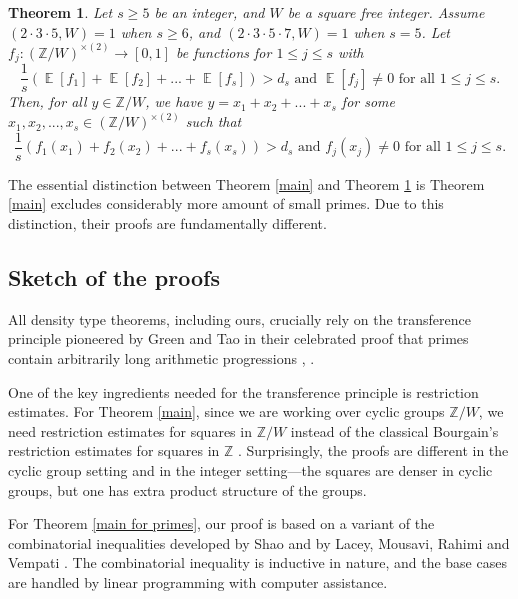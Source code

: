 \documentclass[11pt]{amsart}
\theoremstyle{plain} %
\newtheorem{thm}{Theorem}[section]
\theoremstyle{remark}
\numberwithin{equation}{section}
\newcommand{\E}{\mathop{\mathbb{E}}}
\newcommand{\Z}{\mathbb{Z}}
\begin{document}
\begin{thm}\label{main for almost all moduli}
    Let $s\geq 5$ be an integer, and $W$ be a square free integer. Assume $(2\cdot3\cdot5,W)=1$ when $s\geq 6$, and $(2\cdot3\cdot5\cdot7,W)=1$ when $s=5$. Let $f_j:(\Z/W)^{\times(2)}\longrightarrow[0,1]$ be functions for $1\leq j\leq s$ with
    \begin{equation*}
        \text{$\frac{1}{s}(\E[f_1]+\E[f_2]+...+\E[f_s])>d_s$ and $\E[f_j]\neq 0$ for all $1\leq j\leq s$.}
    \end{equation*}
    Then, for all $y\in \Z/W$, we have $y=x_1+x_2+...+x_s$ for some $x_1,x_2,...,x_s\in (\Z/W)^{\times(2)}$ such that
    \begin{equation*}
        \text{$\frac{1}{s}(f_1(x_1)+f_2(x_2)+...+f_s(x_s))>d_s$ and $f_j(x_j)\neq 0$ for all $1\leq j \leq s$.}
    \end{equation*}
\end{thm}

The essential distinction between Theorem \ref{main} and Theorem \ref{main for almost all moduli} is Theorem \ref{main} excludes considerably more amount of small primes. Due to this distinction, their proofs are fundamentally different.

\subsection{Sketch of the proofs}

All density type theorems, including ours, crucially rely on the transference principle pioneered by Green and Tao in their celebrated proof that primes contain arbitrarily long arithmetic progressions \cite{Green}, \cite{GreenTao}. 

One of the key ingredients needed for the transference principle is restriction estimates. For Theorem \ref{main}, since we are working over cyclic groups $\Z/W$, we need restriction estimates for squares in $\Z/W$ instead of the classical Bourgain's restriction estimates for squares in $\Z$ \cite{Bourgain}. Surprisingly, the proofs are different in the cyclic group setting and in the integer setting---the squares are denser in cyclic groups, but one has extra product structure of the groups.

For Theorem \ref{main for primes}, our proof is based on a variant of the combinatorial inequalities developed by Shao \cite{Shao} and by Lacey, Mousavi, Rahimi and Vempati \cite{lacey2024densitytheoremhigherorder}. The combinatorial inequality is inductive in nature, and the base cases are handled by linear programming with computer assistance.
\end{document}
